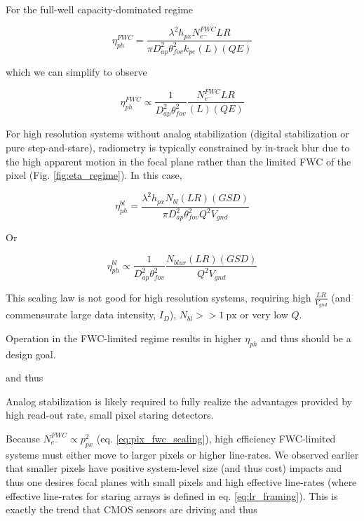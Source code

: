 \documentclass[10pt,journal]{IEEEtran}  %
\begin{document}
{For the full-well capacity-dominated regime

\begin{equation}
    \eta_{ph}^{FWC} = \frac{\lambda^2 h_{px} N_{e^-}^{FWC} LR}{\pi D_{ap}^2 \theta_{fov}^2 k_{pe}(L)(QE)}
\end{equation}

which we can simplify to observe

\begin{equation}
    \label{eq:eta_fwc_scaling}
    \eta_{ph}^{FWC} \propto \frac{1}{D_{ap}^2 \theta_{fov}^2} \frac{N_{e^-}^{FWC} LR}{(L)(QE)}
\end{equation}

For high resolution systems without analog stabilization (digital stabilization or pure step-and-stare), radiometry is typically constrained by in-track blur due to the high apparent motion in the focal plane rather than the limited FWC of the pixel (Fig. \ref{fig:eta_regime}).  In this case,

\begin{equation}
    \label{eq:eta_ph_blur}
    \eta_{ph}^{bl} = \frac{\lambda^2 h_{px}N_{bl}(LR)(GSD)}{\pi D_{ap}^2\theta_{fov}^2 Q^2 V_{gnd}}
\end{equation}

Or 

\begin{equation}
    \label{eq:eta_blur_scaling}
    \eta_{ph}^{bl} \propto \frac{1}{D_{ap}^2 \theta_{fov}^2} \frac{N_{blur} (LR) (GSD)}{Q^2 V_{gnd}}
\end{equation}

This scaling law is not good for high resolution systems, requiring high $\frac{LR}{V_{gnd}}$ (and commensurate large data intensity, $I_{D}$), $N_{bl} >> 1 \: \textrm{px}$ or very low $Q$.

\begin{observation}
Operation in the FWC-limited regime results in higher $\eta_{ph}$ and thus should be a design goal.
\end{observation}
and thus
\begin{observation}
Analog stabilization is likely required to fully realize the advantages provided by high read-out rate, small pixel staring detectors.
\end{observation}

Because $N_{e^-}^{FWC} \propto p_{px}^2$ (eq. \ref{eq:pix_fwc_scaling}), high efficiency FWC-limited systems must either move to larger pixels or higher line-rates.  We observed earlier that smaller pixels have positive system-level size (and thus cost) impacts and thus one desires focal planes with small pixels and high effective line-rates (where effective line-rates for staring arrays is defined in eq. \ref{eq:lr_framing}).  This is exactly the trend that CMOS sensors are driving and thus

}
\end{document}
